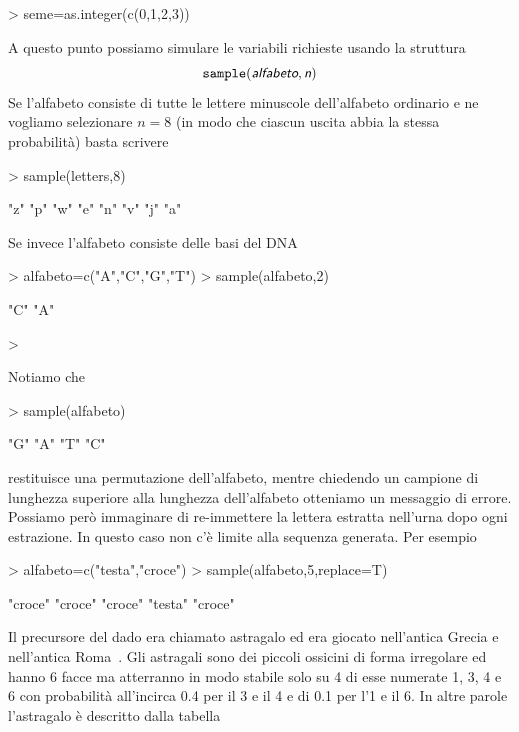 \documentclass[onecolumn,12pt]{book}
\newcommand{\varia}[1]{\textsl{\textsf{#1}}}
\begin{document}
\begin{Schunk}
\begin{Sinput}
> seme=as.integer(c(0,1,2,3))
\end{Sinput}
\end{Schunk}
A questo punto possiamo simulare le variabili richieste usando la struttura
\begin{equation}\texttt{sample}(\varia{alfabeto},\varia{n})\end{equation}
Se l'alfabeto consiste di tutte le lettere minuscole dell'alfabeto ordinario e ne vogliamo selezionare $n=8$  (in modo che ciascun uscita abbia la stessa probabilit\`a)  basta scrivere
\begin{Schunk}
\begin{Sinput}
> sample(letters,8)
\end{Sinput}
\begin{Soutput}
[1] "z" "p" "w" "e" "n" "v" "j" "a"
\end{Soutput}
\end{Schunk}
  Se invece l'alfabeto consiste delle basi del DNA
\begin{Schunk}
\begin{Sinput}
> alfabeto=c("A","C","G","T")
> sample(alfabeto,2)
\end{Sinput}
\begin{Soutput}
[1] "C" "A"
\end{Soutput}
\begin{Sinput}
> 
\end{Sinput}
\end{Schunk}
Notiamo che
\begin{Schunk}
\begin{Sinput}
>  sample(alfabeto)
\end{Sinput}
\begin{Soutput}
[1] "G" "A" "T" "C"
\end{Soutput}
\end{Schunk}
restituisce una permutazione dell'alfabeto, mentre chiedendo un campione di lunghezza superiore alla lunghezza dell'alfabeto otteniamo un messaggio di errore. Possiamo per\`o immaginare di re-immettere la lettera estratta nell'urna dopo ogni estrazione. In questo caso non c'\`e limite alla sequenza generata.
Per esempio
\begin{Schunk}
\begin{Sinput}
> alfabeto=c("testa","croce")
> sample(alfabeto,5,replace=T)
\end{Sinput}
\begin{Soutput}
[1] "croce" "croce" "croce" "testa" "croce"
\end{Soutput}
\end{Schunk}
Il precursore  del dado era chiamato astragalo ed era giocato nell'antica Grecia e nell'antica Roma~\cite{david}.
Gli  astragali sono dei piccoli ossicini di forma irregolare ed hanno 6 facce ma atterranno in  modo stabile solo su 4 di esse numerate 1, 3, 4 e 6  con probabilit\`a all'incirca 0.4 per il 3 e il 4  e di 0.1 per l'1 e il 6. In altre parole l'astragalo \`e descritto dalla tabella
\end{document}
